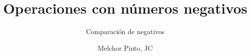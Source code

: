 \documentclass{guia}
\title{Operaciones con números negativos}
\subtitle{Comparación de negativos}
\author{Melchor Pinto, JC}
\begin{document}
%
\begin{questions}
\questionboxed{}
\end{questions}
\end{document}

